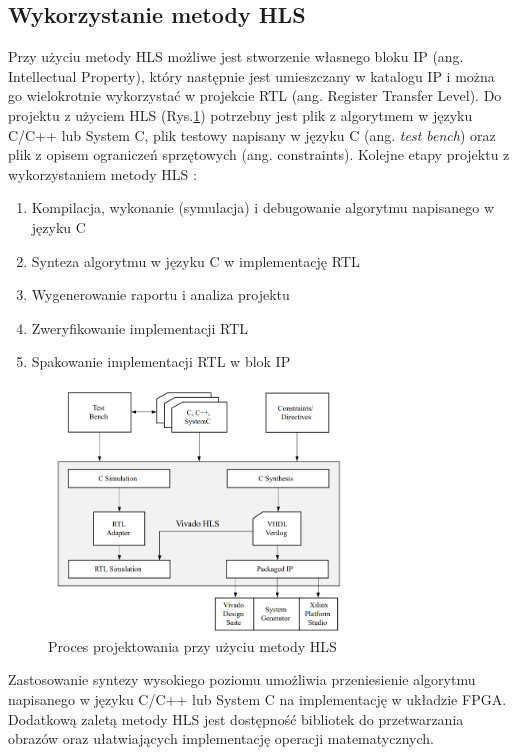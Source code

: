 \subsection{Wykorzystanie metody HLS}
Przy użyciu metody HLS możliwe jest stworzenie własnego bloku IP (ang. 
Intellectual Property), który następnie jest umieszczany w katalogu IP i można 
go wielokrotnie wykorzystać w projekcie RTL (ang. Register Transfer Level).
Do projektu z użyciem HLS (Rys.\ref{hls_design_flow}) potrzebny jest plik 
z algorytmem w języku C/C++ lub System C, plik testowy napisany w języku C 
(ang. \emph{test bench}) oraz plik z opisem ograniczeń sprzętowych (ang. constraints).
Kolejne etapy projektu z wykorzystaniem metody HLS \cite{hlsXilinxGuide}:

\begin{enumerate}
    \item Kompilacja, wykonanie (symulacja) i debugowanie algorytmu napisanego w języku C
    \item Synteza algorytmu w języku C w implementację RTL
    \item Wygenerowanie raportu i analiza projektu
    \item Zweryfikowanie implementacji RTL
    \item Spakowanie implementacji RTL w blok IP
\end{enumerate}


\begin{figure}[h]
  \centering
  \includegraphics[width=0.7\textwidth]{img/hls_design_flow.png}
  \caption{Proces projektowania przy użyciu metody HLS}
  \label{hls_design_flow}
\end{figure}

Zastosowanie syntezy wysokiego poziomu umożliwia przeniesienie algorytmu 
napisanego w języku C/C++ lub System C na implementację w układzie FPGA. 
Dodatkową zaletą metody HLS jest dostępność bibliotek do przetwarzania 
obrazów oraz ułatwiających implementację operacji matematycznych. 

